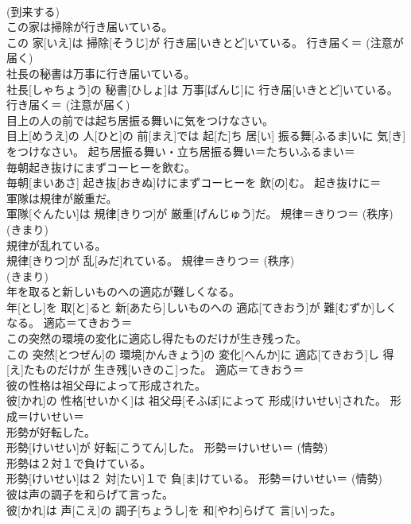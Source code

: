 \documentclass[8pt]{extreport}
\begin{document}
\begin{CJK}{UTF8}{min}
{\\	(到来する) 
\\	この家は掃除が行き届いている。	
\\	この 家[いえ]は 掃除[そうじ]が 行き届[いきとど]いている。	行き届く＝ (注意が届く) 
\\	社長の秘書は万事に行き届いている。	
\\	社長[しゃちょう]の 秘書[ひしょ]は 万事[ばんじ]に 行き届[いきとど]いている。	行き届く＝ (注意が届く) 
\\	目上の人の前では起ち居振る舞いに気をつけなさい。	
\\	目上[めうえ]の 人[ひと]の 前[まえ]では 起[た]ち 居[い] 振る舞[ふるま]いに 気[き]をつけなさい。	起ち居振る舞い・立ち居振る舞い＝たちいふるまい＝ 
\\	毎朝起き抜けにまずコーヒーを飲む。	
\\	毎朝[まいあさ] 起き抜[おきぬ]けにまずコーヒーを 飲[の]む。	起き抜けに＝ 
\\	軍隊は規律が厳重だ。	
\\	軍隊[ぐんたい]は 規律[きりつ]が 厳重[げんじゅう]だ。	規律＝きりつ＝ (秩序) 
\\	(きまり) 
\\	規律が乱れている。	
\\	規律[きりつ]が 乱[みだ]れている。	規律＝きりつ＝ (秩序) 
\\	(きまり) 
\\	年を取ると新しいものへの適応が難しくなる。	
\\	年[とし]を 取[と]ると 新[あたら]しいものへの 適応[てきおう]が 難[むずか]しくなる。	適応＝てきおう＝ 
\\	この突然の環境の変化に適応し得たものだけが生き残った。	
\\	この 突然[とつぜん]の 環境[かんきょう]の 変化[へんか]に 適応[てきおう]し 得[え]たものだけが 生き残[いきのこ]った。	適応＝てきおう＝ 
\\	彼の性格は祖父母によって形成された。	
\\	彼[かれ]の 性格[せいかく]は 祖父母[そふぼ]によって 形成[けいせい]された。	形成＝けいせい＝ 
\\	形勢が好転した。	
\\	形勢[けいせい]が 好転[こうてん]した。	形勢＝けいせい＝ (情勢) 
\\	形勢は２対１で負けている。	
\\	形勢[けいせい]は２ 対[たい]１で 負[ま]けている。	形勢＝けいせい＝ (情勢) 
\\	彼は声の調子を和らげて言った。	
\\	彼[かれ]は 声[こえ]の 調子[ちょうし]を 和[やわ]らげて 言[い]った。	
}
\end{CJK}
\end{document}
